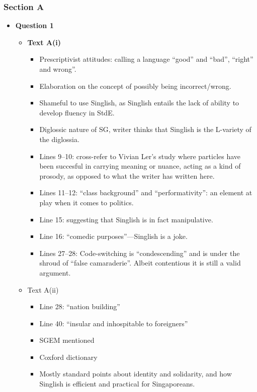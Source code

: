 \documentclass[../main.tex]{subfiles}
\begin{document}
			\subsubsection*{Section A}
				\begin{itemize}
					\item \textbf{Question 1} \begin{itemize}
						\item \textbf{Text A(i)} \begin{itemize}
							\item Prescriptivist attitudes: calling a language ``good'' and ``bad'', ``right'' and wrong''.
							\item Elaboration on the concept of possibly being incorrect/wrong.
							\item Shameful to use Singlish, as Singlish entails the lack of ability to develop fluency in StdE.
							\item Diglossic nature of SG, writer thinks that Singlish is the L-variety of the diglossia.
							\item Lines 9--10: cross-refer to Vivian Ler's study where particles have been succesful in carrying meaning or nuance, acting as a kind of prosody, as opposed to what the writer has written here.
							\item Lines 11--12: ``class background'' and ``performativity'': an element at play when it comes to politics.
							\item Line 15: suggesting that Singlish is in fact manipulative.
							\item Line 16: ``comedic purposes''---Singlish is a joke.
							\item Lines 27--28: Code-switching is ``condescending'' and is under the shroud of ``false camaraderie''. Albeit contentious it is still a valid argument.
						\end{itemize}
						\item Text A(ii) \begin{itemize}
							\item Line 28: ``nation building''
							\item Line 40: ``insular and inhospitable to foreigners''
							\item SGEM mentioned
							\item Coxford dictionary
							\item Mostly standard points about identity and solidarity, and how Singlish is efficient and practical for Singaporeans.
						\end{itemize}
					\end{itemize}


\end{itemize}
\end{document}
